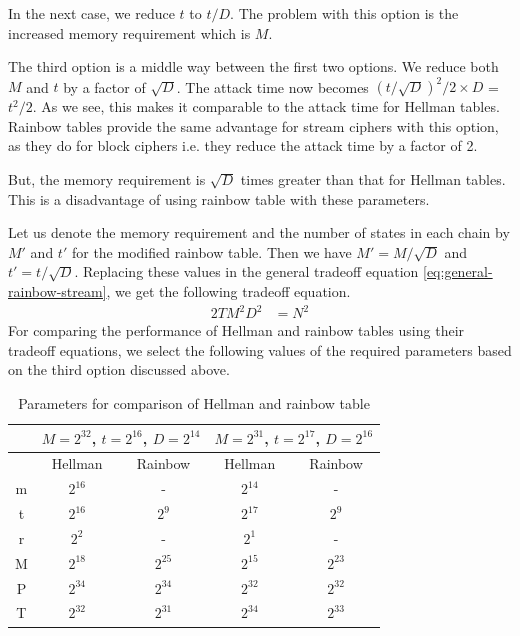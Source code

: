 In the next case, we reduce $t$ to $t/D$. The problem with this option is the increased memory requirement which is $M$. 

The third option is a middle way between the first two options. We reduce both $M$ and $t$ by a factor of $\sqrt{D}$. The attack time now becomes ${(t/\sqrt{D})}^2/2 \times D$ = $t^2/2$. As we see, this makes it comparable to the attack time for Hellman tables. Rainbow tables provide the same advantage for stream ciphers with this option, as they do for block ciphers i.e. they reduce the attack time by a factor of 2. 

But, the memory requirement is $\sqrt{D}$ times greater than that for Hellman tables. This is a disadvantage of using rainbow table with these parameters.

Let us denote the memory requirement and the number of states in each chain by $M'$ and $t'$ for the modified rainbow table. Then we have $M' = M/\sqrt{D}$ and $t' = t/\sqrt{D}$. Replacing these values in the general tradeoff equation \ref{eq:general-rainbow-stream}, we get the following tradeoff equation.
\begin{align}
\label{eq:tmdto-rainbow-stream} 2TM^2D^2 &= N^2
\end{align}
For comparing the performance of Hellman and rainbow tables using their tradeoff equations, we select the following values of the required parameters based on the third option discussed above. 

\begin{table}[ht!]
\begin{center}
\begin{tabular}{|c|c c||c c|}
\hline
			& \multicolumn{2}{c||}{$M = 2^{32}$, $t = 2^{16}$, $D = 2^{14}$} 	& \multicolumn{2}{c|}{$M = 2^{31}$, $t = 2^{17}$, $D = 2^{16}$}	\\ \hline \hline
			&	Hellman				&	Rainbow					&	Hellman					& Rainbow				\\ \hline \hline
m			&	$2^{16}$			&		-							&	$2^{14}$				& 	-						\\ \hline 
t			&	$2^{16}$			&	$2^{9}$					&	$2^{17}$				& $2^{9}$				\\ \hline 
r			&	$2^{2}$				&		-							&	$2^{1}$					& 	-						\\ \hline 
M			&	$2^{18}$			&	$2^{25}$				&	$2^{15}$				& $2^{23}$			\\ \hline 
P			&	$2^{34}$			&	$2^{34}$				&	$2^{32}$				& $2^{32}$			\\ \hline 
T			&	$2^{32}$			&	$2^{31}$				&	$2^{34}$				& $2^{33}$			\\ \hline 
\end{tabular}
\end{center} 
\caption{Parameters for comparison of Hellman and rainbow table}
\label{tab:parameters-comparison}
\end{table}

